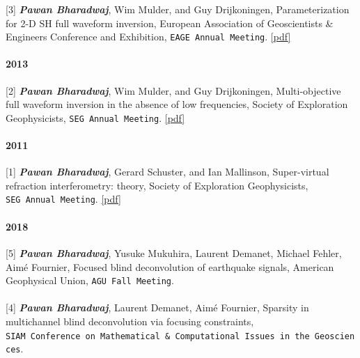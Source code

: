 \documentclass[9pt]{developercv} %
\begin{document}
{[}3{]}
\textbf{\emph{Pawan
Bharadwaj}},
Wim
Mulder,
and Guy
Drijkoningen,
Parameterization
for 2-D SH
full
waveform
inversion,
European
Association
of
Geoscientists
\&
Engineers
Conference
and
Exhibition,
\texttt{EAGE\ Annual\ Meeting}.
\href{https://github.com/pawbz/pawbz.github.io/blob/src/pdf/abstracts/parameterization_EAGE.pdf}{{[}pdf{]}}

\paragraph{2013}\label{section-35}

{[}2{]}
\textbf{\emph{Pawan
Bharadwaj}},
Wim
Mulder,
and Guy
Drijkoningen,
Multi-objective
full
waveform
inversion
in the
absence of
low
frequencies,
Society of
Exploration
Geophysicists,
\texttt{SEG\ Annual\ Meeting}.
\href{https://github.com/pawbz/pawbz.github.io/blob/src/pdf/abstracts/Multi_objectiveFWI.pdf}{{[}pdf{]}}

\paragraph{2011}\label{section-36}

{[}1{]}
\textbf{\emph{Pawan
Bharadwaj}},
Gerard
Schuster,
and Ian
Mallinson,
Super-virtual
refraction
interferometry:
theory,
Society of
Exploration
Geophysicists,
\texttt{SEG\ Annual\ Meeting}.
\href{https://github.com/pawbz/pawbz.github.io/blob/src/pdf/abstracts/SEG_SVITheory.pdf}{{[}pdf{]}}

\label{conference-abstracts}

\paragraph{2018}\label{section-37}

{[}5{]}
\textbf{\emph{Pawan
Bharadwaj}},
Yusuke
Mukuhira,
Laurent
Demanet,
Michael
Fehler,
Aimé
Fournier,
Focused
blind
deconvolution
of
earthquake
signals,
American
Geophysical
Union,
\texttt{AGU\ Fall\ Meeting}.

\paragraph{}\label{section-38}

{[}4{]}
\textbf{\emph{Pawan
Bharadwaj}},
Laurent
Demanet,
Aimé
Fournier,
Sparsity
in
multichannel
blind
deconvolution
via
focusing
constraints,
\texttt{SIAM\ Conference\ on\ Mathematical\ \&\ Computational\ Issues\ in\ the\ Geosciences}.
\end{document}
